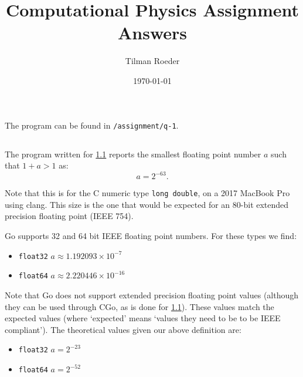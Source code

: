 \documentclass[10pt, a4paper]{article}
\title{Computational Physics Assignment Answers}
\author{Tilman Roeder}
\date{\today}
\begin{document}
\maketitle

\section{}

  \subsection{}
  \label{sec:cgo}
  The program can be found in \texttt{/assignment/q-1}.

  \subsection{}
  The program written for \ref{sec:cgo} reports the smallest floating point number
  $a$ such that $1 + a > 1$ as\footnotemark{}:
  \begin{equation}
    a = 2^{-63}.
  \end{equation}

  Note that this is for the C numeric type \texttt{long double}, on a 2017 MacBook Pro using clang.
  This size is the one that would be expected for an 80-bit extended precision floating point (IEEE 754).

  Go supports 32 and 64 bit IEEE floating point numbers. For these types we find:
  \begin{itemize}
    \item \texttt{float32} $a \approx 1.192093 \times 10^{-7}$
    \item \texttt{float64} $a \approx 2.220446 \times 10^{-16}$
  \end{itemize}

  Note that Go does not support extended precision floating point values (although they can be used through
  CGo, as is done for \ref{sec:cgo}). These values match the expected values (where `expected' means `values
  they need to be to be IEEE compliant'). The theoretical values given our above definition are:
  \begin{itemize}
    \item \texttt{float32} $a = 2^{-23}$
    \item \texttt{float64} $a = 2^{-52}$
  \end{itemize}

\end{document}
